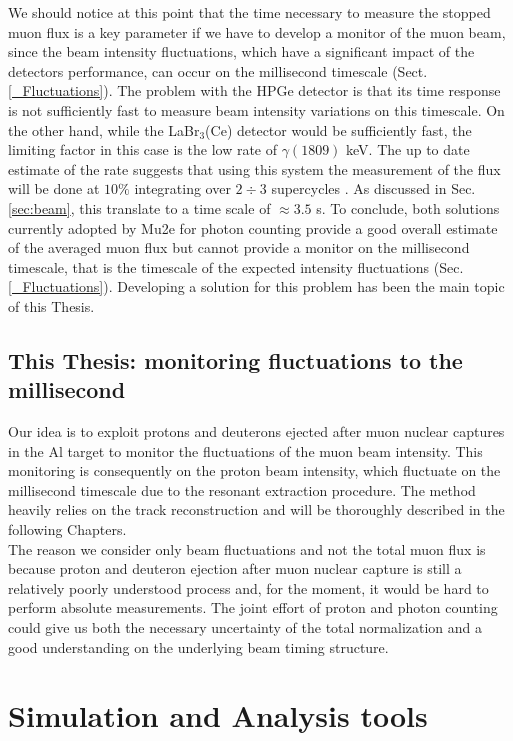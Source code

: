 \documentclass[12pt,a4paper,openright, oneside, titlepage]{book} %
\begin{document}
\noindent
We should notice at this point that the time necessary to measure the stopped muon flux is a key parameter if we have to develop a monitor of the muon beam, since the beam intensity fluctuations, which have a significant impact
of the detectors performance, can occur on the millisecond timescale (Sect. \ref{_Fluctuations}).
The problem with the HPGe detector is that its time response is not
sufficiently fast to measure beam intensity variations on this timescale. 
On the other hand, 
while the LaBr$_3$(Ce) detector would be sufficiently fast, the limiting factor in this case is the low rate of $\gamma(1809)$ keV.
The up to date estimate of the rate suggests that using this system the measurement of the flux will be done at $10\%$ integrating over $2\div3$ supercycles \cite{LaBr3:2019}.
As discussed in Sec. \ref{sec:beam}, this translate to a time scale of $\approx 3.5$ s.
To conclude, both solutions currently adopted by Mu2e for photon counting provide a good overall estimate of the averaged muon flux but cannot provide a monitor on the millisecond timescale, that is the timescale of the expected intensity fluctuations (Sec. \ref{_Fluctuations}).
Developing a solution for this problem has been the main topic of this Thesis.

\subsection{This Thesis: monitoring fluctuations to the millisecond}
Our idea is to exploit protons and deuterons ejected after muon nuclear captures in the Al target to monitor the fluctuations of the muon beam intensity. 
This monitoring is consequently on the proton beam intensity, which fluctuate on the millisecond timescale due to the resonant extraction procedure.
The method heavily relies on the track reconstruction and will be thoroughly described in the following Chapters.\\ 
The reason we consider only beam fluctuations and not the total muon flux is because proton and deuteron ejection after muon nuclear capture is still a relatively poorly understood process and, for the moment, it would be hard to perform absolute measurements.
The joint effort of proton and photon counting could give us both the necessary uncertainty of the total normalization and a good understanding on the underlying beam timing structure.

\section{Simulation and Analysis tools}
\end{document}
